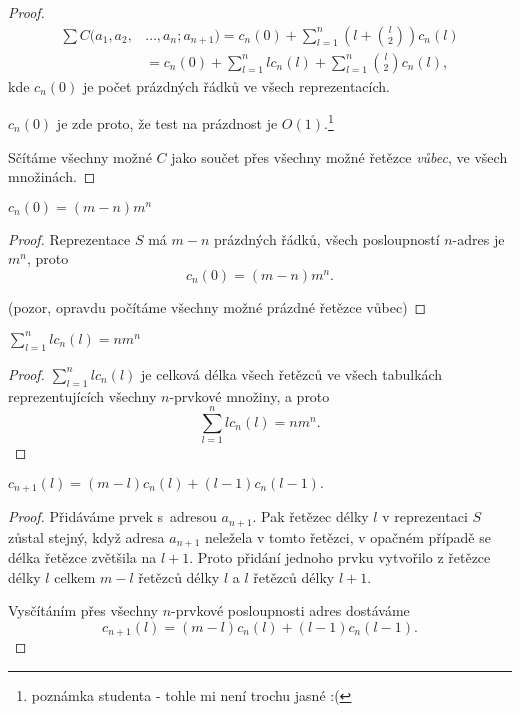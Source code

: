 \documentclass[a4paper,12pt]{article}
\begin{document}
\begin{proof}
\begin{align*}\sum C(a_1,a_2,&\dots,a_n;a_{n+1})=c_n(0)+\sum_{l=1}^n(l+\binom 
l2)c_n(l)\\
&=c_n(0)+\sum_{l=1}^nlc_n(l)+\sum_{l=1}^n\binom l2c_n(l),\end{align*}
kde $c_n(0)$ je počet prázdných řádků ve všech 
reprezentacích.

$c_n(0)$ je zde proto, že test na prázdnost je $O(1)$.\footnote{poznámka studenta - tohle mi není trochu jasné :(}

Sčítáme všechny možné $C$ jako součet přes všechny možné řetězce \emph{vůbec}, ve všech množinách.

\end{proof}

\begin{lemma}
    $c_n(0)=(m-n)m^n$
\end{lemma}

\begin{proof}
Reprezentace $S$ má $m-n$ prázdných řádků, 
všech posloupností $n$-adres je $m^n$, proto 
$$c_n(0)=(m-n)m^n.$$

(pozor, opravdu počítáme všechny možné prázdné řetězce vůbec)
\end{proof}

\begin{lemma}
    $\sum_{l=1}^nlc_n(l)=nm^n$
\end{lemma}

\begin{proof}

$\sum_{l=1}^nlc_n(l)$ je celková délka všech řetězců ve 
všech tabulkách reprezentujících všechny $n$-prvkové 
množiny, a proto 
$$\sum_{l=1}^nlc_n(l)=nm^n.$$
\end{proof}
    
\begin{lemma}
   $c_{n+1}(l)=(m-l)c_n(l)+(l-1)c_n(l-1).$ 
\end{lemma}
\begin{proof}
    Přidáváme prvek s~adresou $a_{n+1}$.  Pak řetězec 
    délky $l$ v reprezentaci $S$ zůstal stejný, když 
    adresa $a_{n+1}$ neležela v tomto řetězci, v opačném případě 
    se délka řetězce zvětšila na $l+1$.  Proto přidání jednoho 
    prvku vytvořilo z řetězce délky $l$ celkem $m-l$ 
    řetězců délky $l$ a $l$ řetězců délky $
    l+1$.  
    
    Vysčítáním přes všechny $n$-prvkové posloupnosti adres 
    dostáváme 
    $$c_{n+1}(l)=(m-l)c_n(l)+(l-1)c_n(l-1).$$
\end{proof}
\end{document}
